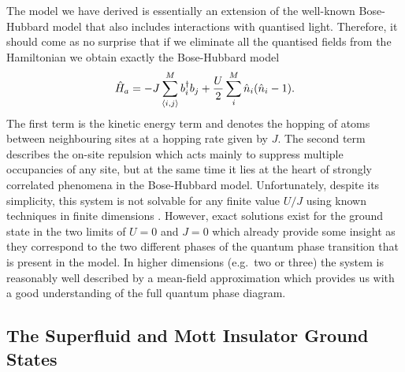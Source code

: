 The model we have derived is essentially an extension of the
well-known Bose-Hubbard model that also includes interactions with
quantised light. Therefore, it should come as no surprise that if we
eliminate all the quantised fields from the Hamiltonian we obtain
exactly the Bose-Hubbard model
\begin{equation}
  \hat{H}_a = -J \sum_{\langle i,j \rangle}^M b^\dagger_i b_j + 
  \frac{U}{2} \sum_{i}^M \hat{n}_i (\hat{n}_i - 1).
\end{equation}
The first term is the kinetic energy term and denotes the hopping of
atoms between neighbouring sites at a hopping rate given by $J$. The
second term describes the on-site repulsion which acts mainly to
suppress multiple occupancies of any site, but at the same time it
lies at the heart of strongly correlated phenomena in the Bose-Hubbard
model. Unfortunately, despite its simplicity, this system is not
solvable for any finite value $U/J$ using known techniques in finite
dimensions \cite{krauth1991, kolovsky2004, calzetta2006}. However,
exact solutions exist for the ground state in the two limits of
$U = 0$ and $J = 0$ which already provide some insight as they
correspond to the two different phases of the quantum phase transition
that is present in the model. In higher dimensions (e.g.~two or three)
the system is reasonably well described by a mean-field approximation
which provides us with a good understanding of the full quantum phase
diagram.

\subsection{The Superfluid and Mott Insulator Ground States}

